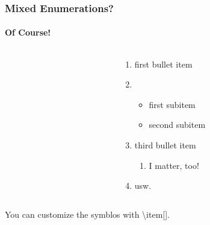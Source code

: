 \begin{frame}
\frametitle{Mixed Enumerations?}
\framesubtitle{Of Course!}

\begin{columns}
\begin{column}{.5\textwidth}
\begin{ttfamily}

\end{ttfamily}
\end{column}
\begin{column}{.5\textwidth}
\begin{enumerate}
\item first bullet item
\item \begin{itemize}
\item first subitem
\item second subitem
\end{itemize}
\item third bullet item
\begin{enumerate}
\item I matter, too!
\end{enumerate}
\item usw.
\end{enumerate}
\end{column}
\end{columns}
\bigskip
You can customize the symblos with \color{nounibaredI}\textbackslash item\color{nounibagreenI}[]\color{black}. 
\end{frame}